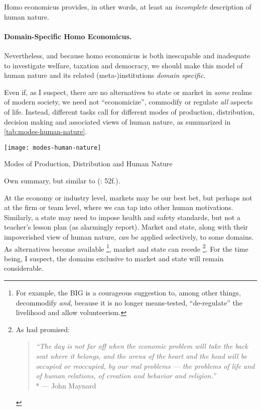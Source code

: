 {Homo economicus provides, in other words, at least an \emph{incomplete} description of human nature.

\paragraph{Domain-Specific Homo Economicus.} 
Nevertheless, and because homo economicus is both inescapable and inadequate to investigate welfare, taxation and democracy, we should make this model of human nature and its related (meta-)institutions \emph{domain specific}.

Even if, as I suspect, there are no alternatives to state or market in \emph{some} realms of modern society, we need not ``economicize'', commodify or regulate \emph{all} aspects of life. 
Instead, different tasks call for different modes of production, distribution, decision making and associated views of human nature, as summarized in \autoref{tab:modes-human-nature}.

\begin{table}[htbp]
	\centering
	\texttt{[image: modes-human-nature]}  
	\caption{Modes of Production, Distribution and Human Nature}
	\label{tab:modes-human-nature}
	\scriptsize{Own summary, but similar to \citeauthor{Schmitter1985} (\citeyear{Schmitter1985}: 52f.).}
\end{table}%

At the economy or industry level, markets may be our best bet, but perhaps not at the firm or team level, where we can tap into other human motivations. 
Similarly, a state may need to impose health and safety standards, but not a teacher's lesson plan (as \citeauthor{Schwartz2010} alarmingly report). 
Market and state, along with their impoverished view of human nature, \emph{can} be applied selectively, to some domains. 
As alternatives become available
\footnote{
	For example, the \gls{BIG} is a courageous suggestion to, among other things, decommodify \emph{and}, because it is no longer means-tested, ``de-regulate'' the livelihood \citep[for example,][]{Offe2009} and allow volunteerism.
}, 
market and state can recede
\footnote{
	As \citeauthor{Keynes} had promised:
	\begin{quote}
		\emph{``The day is not far off when the economic problem will take the back seat where it belongs, and the arena of the heart and the head will be occupied or reoccupied, by our real problems --- the problems of life and of human relations, of creation and behavior and religion.''}\\*
		--- John Maynard \cite{Keynes}%
	\end{quote}
}.
For the time being, I suspect, the domains exclusive to market and state will remain considerable. 

}
